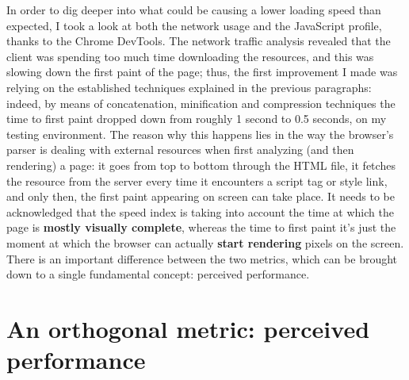 \documentclass[12pt,svgnames]{memoir}
\begin{document}
In order to dig deeper into what could be causing a lower loading speed
than expected, I took a look at both the network usage and the
JavaScript profile, thanks to the Chrome DevTools. The network traffic
analysis revealed that the client was spending too much time downloading
the resources, and this was slowing down the first paint of the page;
thus, the first improvement I made was relying on the established
techniques explained in the previous paragraphs: indeed, by means of
concatenation, minification and compression techniques the time to first
paint dropped down from roughly 1 second to 0.5 seconds, on my testing
environment. The reason why this happens lies in the way the browser's
parser is dealing with external resources when first analyzing (and then
rendering) a page: it goes from top to bottom through the HTML file, it
fetches the resource from the server every time it encounters a script
tag or style link, and only then, the first paint appearing on screen
can take place. It needs to be acknowledged that the speed index is
taking into account the time at which the page is \textbf{mostly
visually complete}, whereas the time to first paint it's just the moment
at which the browser can actually \textbf{start rendering} pixels on the
screen. There is an important difference between the two metrics, which
can be brought down to a single fundamental concept: perceived
performance.

\section{An orthogonal metric: perceived
performance}\label{an-orthogonal-metric-perceived-performance}
\end{document}
